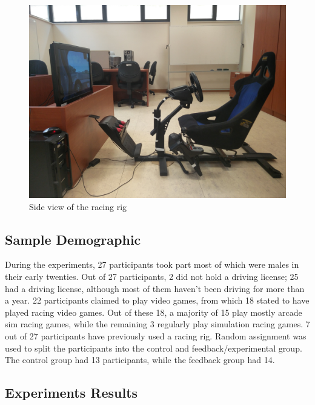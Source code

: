 \documentclass{sig-alternate}
\begin{document}
{\begin{figure}[!htb]
	\centering
	\begin{minipage}{0.45\textwidth}
		\centering
		\includegraphics[width=\textwidth]{images/RacingRig}
	\end{minipage}\hfill
	\caption[Side view of the racing rig]{Side view of the racing rig}
	\label{sec:eval-simRacingRig}
\end{figure}

\subsection{Sample Demographic}
During the experiments, 27 participants took part most of which were males in their early twenties. Out of 27 participants, 2 did not hold a driving license; 25 had a driving license, although most of them haven't been driving for more than a year. 22 participants claimed to play video games, from which 18 stated to have played racing video games. Out of these 18, a majority of 15 play mostly arcade sim racing games, while the remaining 3 regularly play simulation racing games. 7 out of 27 participants have previously used a racing rig. Random assignment was used to split the participants into the control and feedback/experimental group. The control group had 13 participants, while the feedback group had 14.

\subsection{Experiments Results}

}
\end{document}
